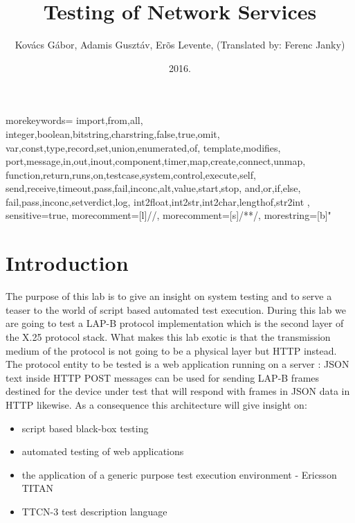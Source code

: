 \documentclass[a4paper]{article}
\title{Testing of Network Services}
\author{Kovács Gábor, Adamis Gusztáv, Erõs Levente, (Translated by: Ferenc Janky)}
\date{2016.}
\begin{document}
{
    morekeywords={
            import,from,all,
            integer,boolean,bitstring,charstring,false,true,omit,
            var,const,type,record,set,union,enumerated,of,
            template,modifies,
            port,message,in,out,inout,component,timer,map,create,connect,unmap,
            function,return,runs,on,testcase,system,control,execute,self,
            send,receive,timeout,pass,fail,inconc,alt,value,start,stop,
            and,or,if,else,
            fail,pass,inconc,setverdict,log,
            int2float,int2str,int2char,lengthof,str2int
        },
    sensitive=true, %
    morecomment=[l]{//}, %
    morecomment=[s]{/*}{*/}, %
    morestring=[b]" %
}
\lstset{language=TTCN3}
\lstset{frame=single}
\lstset{breaklines=true}

\maketitle

\tableofcontents

\section{Introduction}

The purpose of this lab is to give an insight on system testing and to serve a teaser to the world of script based automated
test execution. During this lab we are going to test a LAP-B protocol implementation which is the second layer of the X.25 protocol
stack. What makes this lab exotic is that the transmission medium of the protocol is not going to be a physical layer
but HTTP instead. The protocol entity to be tested is a web application running on a server : JSON text inside HTTP
POST messages can be used for sending LAP-B frames destined for the device under test that will respond with frames in
JSON data in HTTP likewise. As a consequence this architecture will give insight on:
\begin{itemize}
    \item script based black-box testing
    \item automated testing of web applications
    \item the application of a generic purpose test execution environment - Ericsson TITAN
    \item TTCN-3 test description language
\end{itemize}
\end{document}
